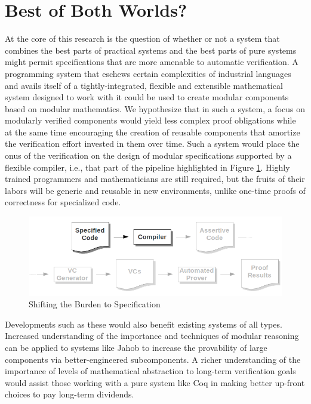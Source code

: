 \section{Best of Both Worlds?}
At the core of this research is the question of whether or not a system that combines the best parts of practical systems and the best parts of pure systems might permit specifications that are more amenable to automatic verification.  A programming system that eschews certain complexities of industrial languages and avails itself of a tightly-integrated, flexible and extensible mathematical system designed to work with it could be used to create modular components based on modular mathematics.  We hypothesize that in such a system, a focus on modularly verified components would yield less complex proof obligations while at the same time encouraging the creation of reusable components that amortize the verification effort invested in them over time.  Such a system would place the onus of the verification on the design of modular specifications supported by a flexible compiler, i.e., that part of the pipeline highlighted in Figure \ref{fig:specification}.  Highly trained programmers and mathematicians are still required, but the fruits of their labors will be generic and reusable in new environments, unlike one-time proofs of correctness for specialized code.

\begin{figure}
  \centering
    \includegraphics[width=\textwidth]{specpart}
  \caption{Shifting the Burden to Specification\label{fig:specification}}
\end{figure}

Developments such as these would also benefit existing systems of all types.  Increased understanding of the importance and techniques of modular reasoning can be applied to systems like Jahob to increase the provability of large components via better-engineered subcomponents.  A richer understanding of the importance of levels of mathematical abstraction to long-term verification goals would assist those working with a pure system like Coq in making better up-front choices to pay long-term dividends.

